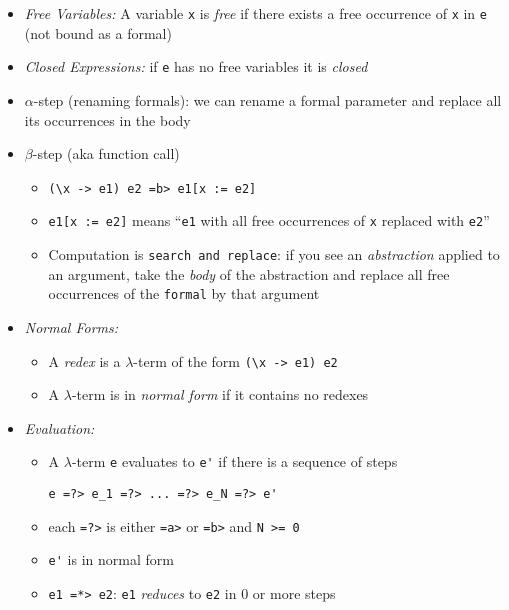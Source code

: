 \documentclass[landscape,8pt]{extarticle}
\newcommand{\code}{\lstinline}
\begin{document}
\begin{multicols}{3}
\begin{itemize}
\begin{itemize}
              \end{itemize}
        \item \emph{Free Variables:} A variable \code{x} is \emph{free} if there exists a free occurrence of \code{x} in \code{e} (not bound as a formal)
        \item \emph{Closed Expressions:} if \code{e} has no free variables it is \emph{closed}
        \item $\alpha$-step (renaming formals): we can rename a formal parameter and replace all its occurrences in the body
        \item $\beta$-step (aka function call)
              \begin{itemize}
                  \item \code{(\x -> e1) e2 =b> e1[x := e2]}
                  \item \code{e1[x := e2]} means ``\code{e1} with all free occurrences of \code{x} replaced with \code{e2}''
                  \item Computation is \code{search and replace}: if you see an \emph{abstraction} applied to an argument, take the \emph{body} of the abstraction and replace all free occurrences of the \code{formal} by that argument
              \end{itemize}
        \item \emph{Normal Forms:}
              \begin{itemize}
                  \item A \emph{redex} is a $\lambda$-term of the form \code{(\x -> e1) e2}
                  \item A $\lambda$-term is in \emph{normal form} if it contains no redexes
              \end{itemize}
        \item \emph{Evaluation:}
              \begin{itemize}
                  \item A $\lambda$-term \code{e} evaluates to \code{e'} if there is a sequence of steps
                        \begin{lstlisting}
e =?> e_1 =?> ... =?> e_N =?> e'
                \end{lstlisting}
                  \item each \code{=?>} is either \code{=a>} or \code{=b>} and \code{N >= 0}
                  \item \code{e'} is in normal form
                  \item \code{e1 =*> e2}: \code{e1} \emph{reduces} to \code{e2} in 0 or more steps

\end{itemize}
\end{itemize}
\end{multicols}
\end{document}
